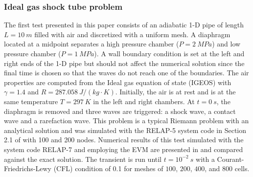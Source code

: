 \documentclass{inputs/mc2015}
\begin{document}
\subsubsection{Ideal gas shock tube problem} \label{sec:air-1-phase-shock-tube}
%
The first test presented in this paper consists of an adiabatic 1-D pipe of length $L=10 \ m$ filled with air and discretized with a uniform mesh.  A diaphragm located at a midpoint separates a high pressure chamber ($P=2 \ MPa$) and low pressure chamber ($P=1 \ MPa$). A wall boundary condition is set at the left and right ends of the 1-D pipe but should not affect the numerical solution since the final time is chosen so that the waves do not reach one of the boundaries. The air properties are computed from the Ideal gas equation of state (IGEOS) with $\gamma=1.4$ and $R=287.058\ J/(kg \cdot K)$. Initially, the air is at rest and is at the same temperature $T=297 \ K$ in the left and right chambers. At $t = 0 \ s$, the diaphragm is removed and three waves are triggered: a shock wave, a contact wave and a rarefaction wave. This problem is a typical Riemann problem with an analytical solution and was simulated with the RELAP-5 system code in Section 2.1 of \cite{Sokolowski-Koszela} with 100 and 200 nodes. Numerical results of this test simulated with the system code RELAP-7 and employing the EVM are presented in  and compared against the exact solution. The transient is run until $t=10^{-2} \ s$ with a Courant-Friedrichs-Lewy (CFL) condition of 0.1 for meshes of $100$, $200$, $400$, and $800$ cells. 
%
\end{document}
